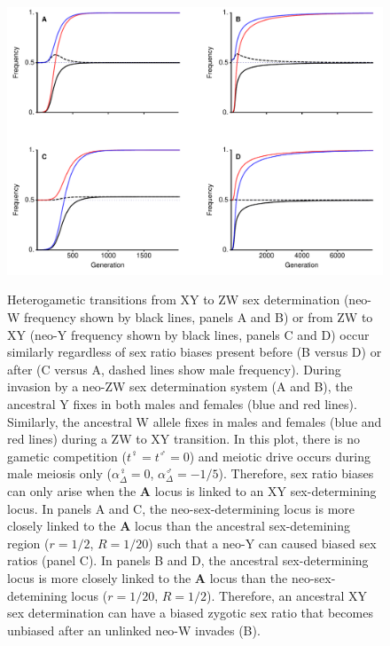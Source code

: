 \documentclass[12pt]{article}
\begin{document}
\begin{figure}[!h]
\centering
\includegraphics[width=\linewidth]{Combination_Turnover}\\
\caption{
Heterogametic transitions from XY to ZW sex determination (neo-W frequency shown by black lines, panels A and B) or from ZW to XY (neo-Y frequency shown by black lines, panels C and D) occur similarly regardless of sex ratio biases present before (B versus D) or after (C versus A, dashed lines show male frequency). 
During invasion by a neo-ZW sex determination system (A and B), the ancestral Y fixes in both males and females (blue and red lines). 
Similarly, the ancestral W allele fixes in males and females (blue and red lines) during a ZW to XY transition. 
In this plot, there is no gametic competition ($t^\female=t^\male=0$) and meiotic drive occurs during male meiosis only ($\alpha^\female_{\Delta}=0$, $\alpha^\male_{\Delta}=-1/5$). Therefore, sex ratio biases can only arise when the \textbf{A} locus is linked to an XY sex-determining locus.
In panels A and C, the neo-sex-determining locus is more closely linked to the \textbf{A} locus than the ancestral sex-detemining region ($r=1/2$, $R=1/20$) such that a neo-Y can caused biased sex ratios (panel C).
In panels B and D, the ancestral sex-determining locus is more closely linked to the \textbf{A} locus than the neo-sex-detemining locus ($r=1/20$, $R=1/2$). 
Therefore, an ancestral XY sex determination can have a biased zygotic sex ratio that becomes unbiased after an unlinked neo-W invades (B). 
}
\end{figure}
\end{document}
